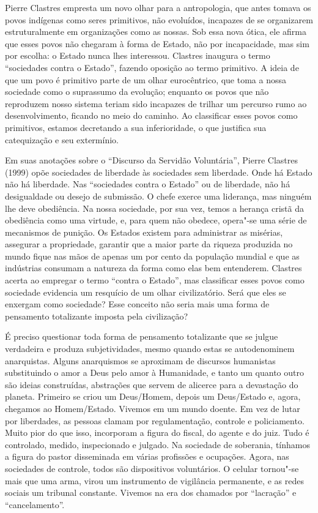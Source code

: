 Pierre Clastres empresta um novo olhar para a antropologia, que antes
tomava os povos indígenas como seres primitivos, não evoluídos,
incapazes de se organizarem estruturalmente em organizações como as
nossas. Sob essa nova ótica, ele afirma que esses povos não chegaram à
forma de Estado, não por incapacidade, mas sim por escolha: o Estado
nunca lhes interessou. Clastres inaugura o termo ``sociedades contra o
Estado'', fazendo oposição ao termo primitivo. A ideia de que um povo é
primitivo parte de um olhar eurocêntrico, que toma a nossa sociedade
como o suprassumo da evolução; enquanto os povos que não reproduzem
nosso sistema teriam sido incapazes de trilhar um percurso rumo ao
desenvolvimento, ficando no meio do caminho. Ao classificar esses povos
como primitivos, estamos decretando a sua inferioridade, o que justifica
sua catequização e seu extermínio.

Em suas anotações sobre o ``Discurso da Servidão Voluntária'', Pierre
Clastres (1999) opõe sociedades de liberdade às sociedades sem
liberdade. Onde há Estado não há liberdade. Nas ``sociedades contra o
Estado'' ou de liberdade, não há desigualdade ou desejo de submissão. O
chefe exerce uma liderança, mas ninguém lhe deve obediência. Na nossa
sociedade, por sua vez, temos a herança cristã da obediência como uma
virtude, e, para quem não obedece, opera"-se uma série de mecanismos de
punição. Os Estados existem para administrar as misérias, assegurar a
propriedade, garantir que a maior parte da riqueza produzida no mundo
fique nas mãos de apenas um por cento da população mundial e que as
indústrias consumam a natureza da forma como elas bem entenderem.
Clastres acerta ao empregar o termo ``contra o Estado'', mas classificar
esses povos como sociedade evidencia um resquício de um olhar
civilizatório. Será que eles se enxergam como sociedade? Esse conceito
não seria mais uma forma de pensamento totalizante imposta pela
civilização?

É preciso questionar toda forma de pensamento totalizante que se julgue
verdadeira e produza subjetividades, mesmo quando estas se autodenominem
anarquistas. Alguns anarquismos se aproximam de discursos humanistas
substituindo o amor a Deus pelo amor à Humanidade, e tanto um quanto
outro são ideias construídas, abstrações que servem de alicerce para a
devastação do planeta. Primeiro se criou um Deus/Homem, depois um
Deus/Estado e, agora, chegamos ao Homem/Estado. Vivemos em um mundo
doente. Em vez de lutar por liberdades, as pessoas clamam por
regulamentação, controle e policiamento. Muito pior do que isso,
incorporam a figura do fiscal, do agente e do juiz. Tudo é controlado,
medido, inspecionado e julgado. Na sociedade de soberania, tínhamos a
figura do pastor disseminada em várias profissões e ocupações. Agora,
nas sociedades de controle, todos são dispositivos voluntários. O
celular tornou"-se mais que uma arma, virou um instrumento de vigilância
permanente, e as redes sociais um tribunal constante. Vivemos na era dos
chamados por ``lacração'' e ``cancelamento''.

